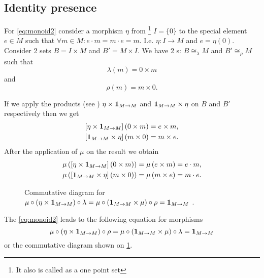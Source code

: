 \subsection{Identity presence}
For \eqref{eq:monoid2} consider a morphism $\eta$ from
\footnote{
 It also is called \cite{bib:maclane98} as a one point set
}
$I = \{0\}$ to the special element $e \in M$ such that
$\forall m \in M: e \cdot m = m \cdot e = m$. I.e. $\eta: I \to M$ and
$e = \eta(0)$. Consider 2 sets $B = I \times M$ and $B' = M \times I$. 
We have 2 s: $B \cong_\lambda M$ and $B'
\cong_\rho M$ such that
\[
\lambda(m) = 0 \times m
\] 
and
\[
\rho(m) = m \times 0.
\] 

If we apply the products (see ) $\eta \times \mathbf{1}_{ M \to M }$ and
$\mathbf{1}_{ M \to M } \times \eta$ on $B$ and $B'$ respectively then we get
\begin{eqnarray}
\left[\eta \times \mathbf{1}_{ M \to M } \right]\left(0 \times m\right) = e \times m,
\nonumber \\
\left[\mathbf{1}_{ M \to M } \times \eta \right]\left(m \times 0\right) = m \times e.
\nonumber
\end{eqnarray}
After the application of $\mu$ on the result we obtain
\begin{eqnarray}
\mu \left(\left[\eta \times \mathbf{1}_{ M \to M }\right] \left(0 \times m\right) \right) 
= \mu \left( e \times m \right) = e \cdot m,
\nonumber \\
\mu \left(\left[ \mathbf{1}_{ M \to M } \times \eta \right]\left(m \times 0\right) \right) = 
\mu \left(m \times e \right) = m \cdot e.
\nonumber
\end{eqnarray}
\begin{figure}
  \centering
  \caption{Commutative diagram for $\mu \circ (\eta \times \mathbf{1}_{ M \to M })
    \circ \lambda = \mu \circ (\mathbf{1}_{ M \to M } \times \mu) \circ \rho =
    \mathbf{1}_{ M \to M }$ .} 
  \label{fig:monoid_eta_lambda_rho}
\end{figure}
The \eqref{eq:monoid2} leads to the following equation for morphisms
\[
\mu \circ (\eta \times \mathbf{1}_{ M \to M }) \circ \rho = 
\mu \circ (\mathbf{1}_{ M \to M } \times \mu) \circ \lambda = 
\mathbf{1}_{ M \to M }
\]
or the commutative diagram shown on \cref{fig:monoid_eta_lambda_rho}.

